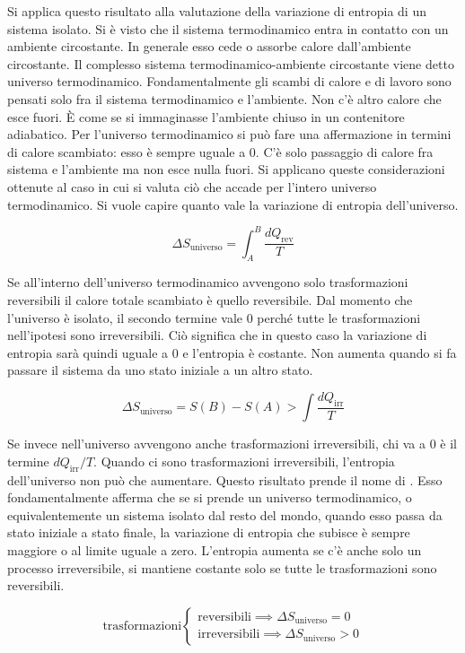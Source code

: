 Si applica questo risultato alla valutazione della variazione di entropia di un sistema isolato. Si è visto che il sistema termodinamico entra in contatto con un ambiente circostante. In generale esso cede o assorbe calore dall'ambiente circostante. Il complesso sistema termodinamico-ambiente circostante viene detto universo termodinamico. Fondamentalmente gli scambi di calore e di lavoro sono pensati solo fra il sistema termodinamico e l'ambiente. Non c'è altro calore che esce fuori. È come se si immaginasse l'ambiente chiuso in un contenitore adiabatico. Per l'universo termodinamico si può fare una affermazione in termini di calore scambiato: esso è sempre uguale a $0$. C'è solo passaggio di calore fra sistema e l'ambiente ma non esce nulla fuori. Si applicano queste considerazioni ottenute al caso in cui si valuta ciò che accade per l'intero universo termodinamico. Si vuole capire quanto vale la variazione di entropia dell'universo.

\[
	\Delta S_{\text{universo} } = \int_A^B \frac{dQ_{\text{rev} } }{T}
\]

Se all'interno dell'universo termodinamico avvengono solo trasformazioni reversibili il calore totale scambiato è quello reversibile. Dal momento che l'universo è isolato, il secondo termine vale $0$ perché tutte le trasformazioni nell'ipotesi sono irreversibili. Ciò significa che in questo caso la variazione di entropia sarà quindi uguale a $0$ e l'entropia è costante. Non aumenta quando si fa passare il sistema da uno stato iniziale a un altro stato.

\[
	\Delta S_{\text{universo}} = S(B)-S(A) > \int \frac{dQ_{\text{irr} } }{T}
\]

Se invece nell'universo avvengono anche trasformazioni irreversibili, chi va a $0$ è il termine $dQ_\text{irr}/T$. Quando ci sono trasformazioni irreversibili, l'entropia dell'universo non può che aumentare. Questo risultato prende il nome di . Esso fondamentalmente afferma che se si prende un universo termodinamico, o equivalentemente un sistema isolato dal resto del mondo,  quando esso passa da stato iniziale a stato finale, la variazione di entropia che subisce è sempre maggiore o al limite uguale a zero. L'entropia aumenta se c'è anche solo un processo irreversibile, si mantiene costante solo se tutte le trasformazioni sono reversibili.

\[
	\text{trasformazioni}
	\left\{ \begin{array}{l}
	 	\text{reversibili} \implies \Delta S_{\text{universo}} = 0 \\
		\text{irreversibili} \implies  \Delta S_{\text{universo}} > 0
	\end{array} \right.
\]

